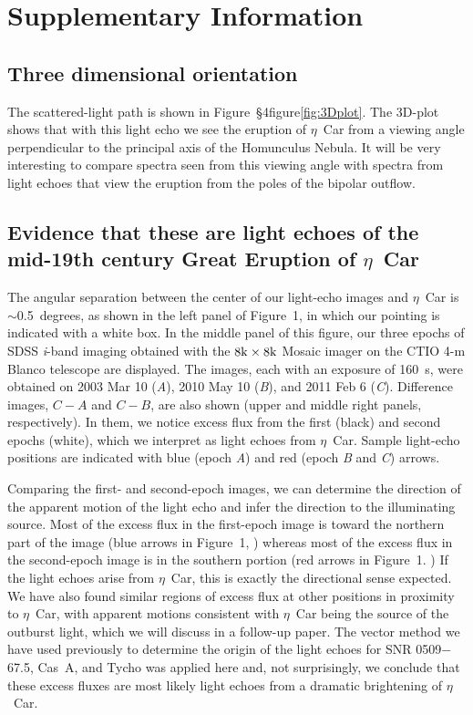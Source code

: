 \clearpage
\renewcommand*{\thesection}{S\arabic{section}}

\section{Supplementary Information\label{sec:SI}}
\subsection{Three dimensional orientation}
The scattered-light path is shown in Figure~\S4figure\ref{fig:3Dplot}.  The
3D-plot shows that with this light echo we see the eruption of
$\eta$~Car from a viewing angle perpendicular to the principal axis of
the Homunculus Nebula. It will be very interesting to compare spectra
seen from this viewing angle with spectra from light echoes that view
the eruption from the poles of the bipolar outflow.


\subsection{Evidence that these are light echoes of the mid-19th century Great
Eruption of $\eta$~Car}

The angular separation between the center of our light-echo images and
$\eta$~Car is $\sim$0.5~degrees, as shown in the left panel of
Figure~1,
\ifcheck
\fi
in which our pointing is indicated with a white box. In the middle
panel of this figure, our three epochs of SDSS {\it i}-band imaging
obtained with the $\rm8k\times8k$ Mosaic imager on the CTIO 4-m Blanco
telescope are displayed. The images, each with an exposure of 160~s,
were obtained on 2003 Mar 10 ({\it A}), 2010 May 10 ({\it B}), and
2011 Feb 6 ({\it C}).  Difference images, $C-A$ and $C-B$, are also
shown (upper and middle right panels, respectively). In them, we
notice excess flux from the first (black) and second epochs (white),
which we interpret as light echoes from $\eta$~Car.  Sample light-echo
positions are indicated with blue (epoch {\it A}) and red (epoch {\it
B} and {\it C}) arrows.

Comparing the first- and second-epoch images, we can determine the
direction of the apparent motion of the light echo and infer the
direction to the illuminating source. Most of the excess flux in the
first-epoch image is toward the northern part of the image (blue
arrows in Figure~1,
\ifcheck
  )
\fi
whereas most of the excess flux in the second-epoch image is in the
southern portion (red arrows in Figure~1.
\ifcheck
  ) 
\fi
If the light echoes arise from $\eta$~Car, this is exactly the
directional sense expected. We have also found similar regions of
excess flux at other positions in proximity to $\eta$~Car, with
apparent motions consistent with $\eta$~Car being the source of the
outburst light, which we will discuss in a follow-up paper.  The
vector method we have used previously to determine the origin of the
light echoes for SNR 0509$-$67.5, Cas~A, and
Tycho\cite{Rest05b,Rest08b} was applied here and, not surprisingly, we
conclude that these excess fluxes are most likely light echoes from a
dramatic brightening of $\eta$~Car.

